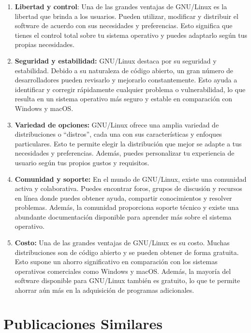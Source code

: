 \documentclass[
  jou,
  floatsintext,
  longtable,
  a4paper,
  nolmodern,
  notxfonts,
  notimes,
  12pt,
  colorlinks=true,linkcolor=blue,citecolor=blue,urlcolor=blue]{apa7}
\begin{document}
\begin{enumerate}
\def\labelenumi{\arabic{enumi}.}
\item
  \textbf{Libertad y control}: Una de las grandes ventajas de GNU/Linux
  es la libertad que brinda a los usuarios. Pueden utilizar, modificar y
  distribuir el software de acuerdo con sus necesidades y preferencias.
  Esto significa que tienes el control total sobre tu sistema operativo
  y puedes adaptarlo según tus propias necesidades.
\item
  \textbf{Seguridad y estabilidad:} GNU/Linux destaca por su seguridad y
  estabilidad. Debido a su naturaleza de código abierto, un gran número
  de desarrolladores pueden revisarlo y mejorarlo constantemente. Esto
  ayuda a identificar y corregir rápidamente cualquier problema o
  vulnerabilidad, lo que resulta en un sistema operativo más seguro y
  estable en comparación con Windows y macOS.
\item
  \textbf{Variedad de opciones:} GNU/Linux ofrece una amplia variedad de
  distribuciones o ``distros'', cada una con sus características y
  enfoques particulares. Esto te permite elegir la distribución que
  mejor se adapte a tus necesidades y preferencias. Además, puedes
  personalizar tu experiencia de usuario según tus propios gustos y
  requisitos.
\item
  \textbf{Comunidad y soporte:} En el mundo de GNU/Linux, existe una
  comunidad activa y colaborativa. Puedes encontrar foros, grupos de
  discusión y recursos en línea donde puedes obtener ayuda, compartir
  conocimientos y resolver problemas. Además, la comunidad proporciona
  soporte técnico y existe una abundante documentación disponible para
  aprender más sobre el sistema operativo.
\item
  \textbf{Costo:} Una de las grandes ventajas de GNU/Linux es su costo.
  Muchas distribuciones son de código abierto y se pueden obtener de
  forma gratuita. Esto supone un ahorro significativo en comparación con
  los sistemas operativos comerciales como Windows y macOS. Además, la
  mayoría del software disponible para GNU/Linux también es gratuito, lo
  que te permite ahorrar aún más en la adquisición de programas
  adicionales.
\end{enumerate}

\section{Publicaciones Similares}\label{publicaciones-similares}
\end{document}
